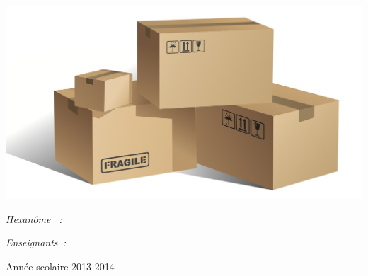 \begin{center}
	\includegraphics [scale=0.55]{images/livraison.jpg} \\[0.7cm]
	\begin{minipage}[t]{0.4\textwidth}
	  \begin{flushleft} \large
	    \emph{Hexanôme \textbf{\hexanome}~:}\\
	    \small \reportauthor
	  \end{flushleft}
	\end{minipage}
	\begin{minipage}[t]{0.5\textwidth}
	  \begin{flushright} \large
	    \emph{Enseignants~:} \\
	    \enseignants
	  \end{flushright}
	\end{minipage}

	\vfill
	\footnotesize{Année scolaire 2013-2014}
\end{center}
